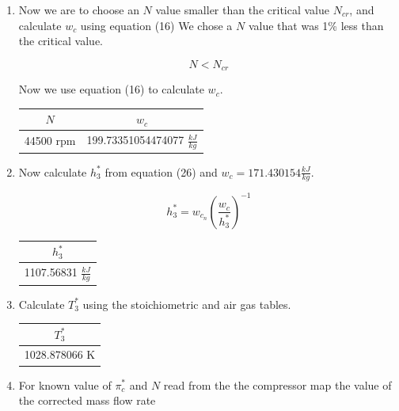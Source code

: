 \documentclass[titlepage]{article}
\begin{document}
\begin{enumerate}
  \item Now we are to choose an $N$ value smaller than the critical value $N_{cr}$, and calculate $w_{c}$ using equation (16)
  We chose a $N$ value that was 1\% less than the critical value.

  \begin{equation}
    N < N_{cr}
  \end{equation}

  Now we use equation (16) to calculate $w_{c}$. 

  \begin{center}
    \begin{tabular}{|c|c|}
      \hline
      $N$ & $w_{c}$ \\
      \hline
      44500 rpm & 199.73351054474077 $\frac{kJ}{kg}$ \\
      \hline
    \end{tabular}
  \end{center}

  \item Now calculate $h_{3}^{*}$ from equation (26) and $w_{c} = 171.430154 \frac{kJ}{kg}$.
  
  \begin{equation}
    h_{3}^{*} = w_{c_{n}} \left( \frac{w_{c}}{h_{3}^{*}}\right)^{-1}
  \end{equation}

  \begin{center}
    \begin{tabular}{|c|}
      \hline
      $h_{3}^{*}$ \\
      \hline
      1107.56831 $\frac{kJ}{kg}$ \\
      \hline
    \end{tabular}
  \end{center}

  \item Calculate $T_{3}^{*}$ using the stoichiometric and air gas tables. 
  
  \begin{center}
    \begin{tabular}{|c|}
      \hline
      $T_{3}^{*}$ \\
      \hline
      1028.878066 K \\
      \hline
    \end{tabular}
  \end{center}

  \item For known value of $\pi_{c}^{*}$ and $N$ read from the the compressor map the value of the corrected mass flow rate


\end{enumerate}
\end{document}
